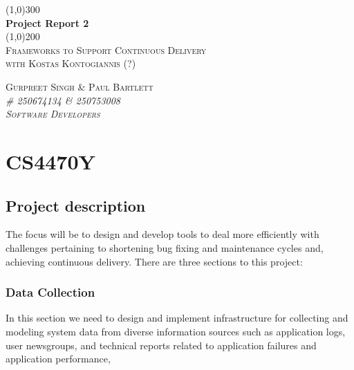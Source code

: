 \documentclass[11pt,]{article}
\begin{document}
\doublespacing

\begin{titlepage}
    \begin{center}
    \line(1,0){300} \\ 
    [0.25in]
    \huge{\bfseries Project Report 2} \\
    [2mm]
    \line(1,0){200} \\
    [1.5cm] 
    \textsc{\Large Frameworks to Support Continuous Delivery} \\
    [0.75cm]
    \textsc{\Large with Kostas Kontogiannis (?)} \\
    [10cm]
    \end{center}
    
    \begin{flushright}
    \textsc{\Large{Gurpreet Singh \& Paul Bartlett \\} \normalsize\emph{\# 250674134 \& 250753008 \\} \normalsize\emph{Software Developers \\} }
    
    \end{flushright}
    
\end{titlepage}


\newpage

{
\hypersetup{linkcolor=black}
\setcounter{tocdepth}{2}
\tableofcontents
\newpage
}
\section{CS4470Y}\label{cs4470y}

\subsection{Project description}\label{project-description}

The focus will be to design and develop tools to deal more efficiently
with challenges pertaining to shortening bug fixing and maintenance
cycles and, achieving continuous delivery. There are three sections to
this project:

\subsubsection{Data Collection}\label{data-collection}

In this section we need to design and implement infrastructure for
collecting and modeling system data from diverse information sources
such as application logs, user newsgroups, and technical reports related
to application failures and application performance,
\end{document}
